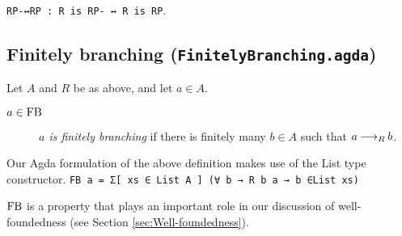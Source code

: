 \verb|RP-↔RP : R is RP- ↔ R is RP|.

\subsection{Finitely branching (\texttt{FinitelyBranching.agda})}

\begin{definition} Let $A$ and $R$ be as above, and let $a \in A$.
    \begin{description}
        \item[$a \in \mathrm{FB}$] \emph{$a$ is finitely branching} if there is finitely many $b \in A$ such that $a \mathbin{\longrightarrow_R} b$.
    \end{description}
\end{definition}

Our Agda formulation of the above definition makes use of the List type constructor.
\verb|FB a = Σ[ xs ∈ List A ] (∀ b → R b a → b ∈List xs)|

$\mathrm{FB}$ is a property that plays an important role in our discussion of well-foundedness (see Section \ref{sec:Well-foundedness}).
